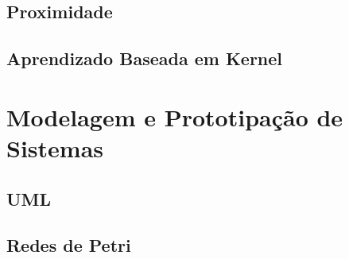     \subsection{Proximidade}
    \subsection{Aprendizado Baseada em Kernel}
\section{Modelagem e Prototipação de Sistemas}
    \subsection{UML}
    \subsection{Redes de Petri}